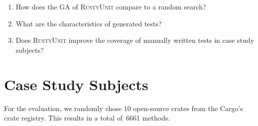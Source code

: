 \documentclass[paper=a4,%
  twoside,%
  BCOR4mm,%
  abstract=true,%
  toc=bibliography,%
  chapterprefix=true,%
  toc=bibliographynumbered,%
  open=right,%
  english,%
  pagesize=pdftex]{scrreprt}
\newcommand{\benchnum}{10\xspace}
\newcommand{\methodsnum}{6661\xspace}
\newcommand{\tech}{\textsc{RustyUnit}\xspace}
\newcommand{\sut}{\ac{SUT}\xspace}
\begin{document}

\begin{enumerate}[start=1, label={\bfseries RQ\arabic*:}]
    \item How does the \ac{GA} of \tech compare to a random search?
    \item What are the characteristics of generated tests? 
    
    \item Does \tech improve the coverage of manually written tests in case study subjects?
\end{enumerate} 

\section{Case Study Subjects}
\label{sec:case-study-subjects}
For the evaluation, we randomly chose \benchnum open-source crates from the Cargo's crate registry. This results in a total of~\methodsnum methods.
\end{document}
